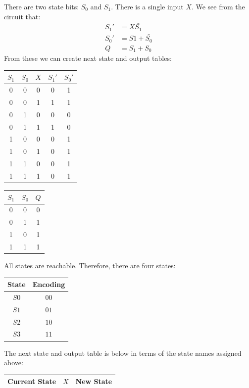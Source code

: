 \documentclass[12pt]{article}
\newenvironment{sol}[1][Solution]{\begin{trivlist}
		\item[\hskip \labelsep {\bfseries #1:}]}{\end{trivlist}}
\begin{document}
\begin{sol}
	There are two state bits: $S_0$ and $S_1$. There
	is a single input $X$. We see from the circuit that:
	\begin{align*}
		S_1'&=X\bar{S_1}\\
		S_0'&=S1+\bar{S_0}\\
		Q&=S_1+S_0
	\end{align*}
	From these we can create next state and output tables:
	\begin{center}
		\begin{tabular}{cc|c|cc}
			$S_1$ & $S_0$ & $X$ & $S_1'$ & $S_0'$\\
			\hline
			0 & 0 & 0 & 0 & 1 \\
			0 & 0 & 1 & 1 & 1 \\
			0 & 1 & 0 & 0 & 0 \\
			0 & 1 & 1 & 1 & 0 \\
			1 & 0 & 0 & 0 & 1 \\
			1 & 0 & 1 & 0 & 1 \\
			1 & 1 & 0 & 0 & 1 \\
			1 & 1 & 1 & 0 & 1 \\
		\end{tabular}
		\quad
		\begin{tabular}{cc|c}
			$S_1$ & $S_0$ & $Q$\\
			\hline
			0 & 0 & 0\\
			0 & 1 & 1\\
			1 & 0 & 1\\
			1 & 1 & 1\\
		\end{tabular}
	\end{center}
	All states are reachable. Therefore, there are four states:
	\begin{center}
		\begin{tabular}{c|c}
			State & Encoding\\
			\hline
			$S0$ & $00$\\
			$S1$ & $01$\\
			$S2$ & $10$\\
			$S3$ & $11$\\
		\end{tabular}
	\end{center}
	The next state and output table is below in terms of the state names assigned above:
	\begin{center}
		\begin{tabular}{ccc}
			Current State & $X$ & New State \\
			\hline

\end{tabular}
\end{center}
\end{sol}
\end{document}
